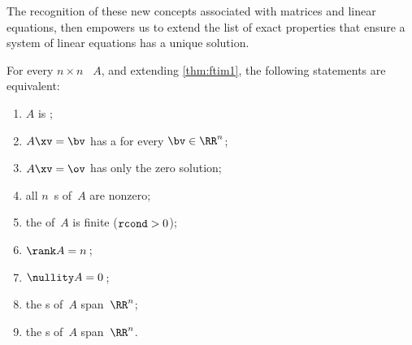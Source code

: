 The recognition of these new concepts associated with matrices and linear equations, then empowers us to extend the list of exact properties that ensure a system of linear equations has a unique solution. 

\begin{theorem}  \label{thm:ftim2} 
For every \(n\times n\) ~\(A\), and extending \autoref{thm:ftim1}, the following statements are equivalent:
\begin{enumerate}
\item\label{thm:ftim2i} \(A\) is ;
\item\label{thm:ftim2ii} \(A\xv=\bv\) has a  for every \(\bv\in\RR^n\);
\item\label{thm:ftim2iii} \(A\xv=\ov\) has only the zero solution;
\item\label{thm:ftim2iv} all \(n\)~s of~\(A\) are nonzero;
\item\label{thm:ftim2ivx} the  of~\(A\) is finite (\(\verb|rcond|>0\));
\item\label{thm:ftim2v} \(\rank A=n\)\,;
\item\label{thm:ftim2vi} \(\nullity A=0\)\,;
\item\label{thm:ftim2vii} the s of~\(A\) span~\(\RR^n\);
\item\label{thm:ftim2viii} the s of~\(A\) span~\(\RR^n\).
\end{enumerate}
\end{theorem}
